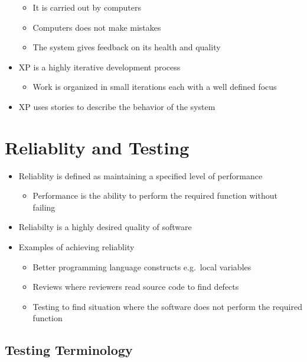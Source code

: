 \documentclass[11pt]{article}
\providecommand{\tightlist}{%
      \setlength{\itemsep}{0pt}\setlength{\parskip}{0pt}}
\begin{document}
\begin{itemize}
  \begin{itemize}
  \tightlist
  \item
    It is carried out by computers
  \item
    Computers does not make mistakes
  \item
    The system gives feedback on its health and quality
  \end{itemize}
\item
  XP is a highly iterative development process

  \begin{itemize}
  \tightlist
  \item
    Work is organized in small iterations each with a well defined focus
  \end{itemize}
\item
  XP uses stories to describe the behavior of the system
\end{itemize}

    \hypertarget{reliablity-and-testing}{%
\section{Reliablity and Testing}\label{reliablity-and-testing}}

\begin{itemize}
\tightlist
\item
  Reliablity is defined as maintaining a specified level of performance

  \begin{itemize}
  \tightlist
  \item
    Performance is the ability to perform the required function without
    failing
  \end{itemize}
\item
  Reliabilty is a highly desired quality of software
\item
  Examples of achieving reliablity

  \begin{itemize}
  \tightlist
  \item
    Better programming language constructs e.g.~local variables
  \item
    Reviews where reviewers read source code to find defects
  \item
    Testing to find situation where the software does not perform the
    required function
  \end{itemize}
\end{itemize}

\hypertarget{testing-terminology}{%
\subsection{Testing Terminology}\label{testing-terminology}}
\end{document}
